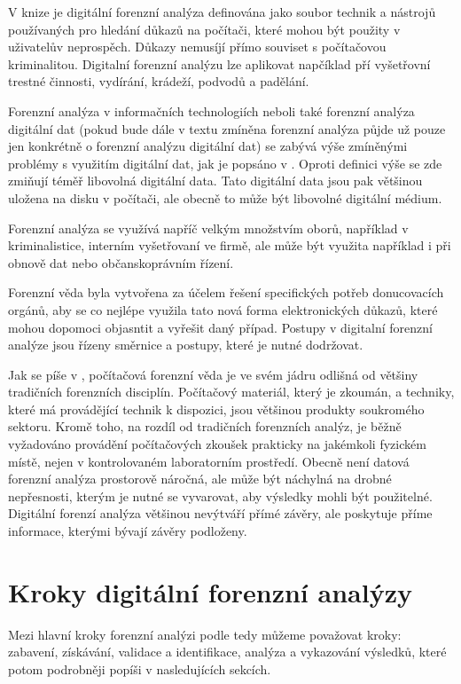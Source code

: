 \documentclass[thesis=B,czech]{FITthesis}[2012/06/26]
\begin{document}
V knize \cite{RECHAndBook} je digitální forenzní analýza definována jako soubor technik a nástrojů používaných pro hledání důkazů na počítači, které mohou být použity v uživatelův neprospěch. Důkazy nemusíjí přímo souviset s počítačovou kriminalitou. Digitalní forenzní analýzu lze aplikovat napčíklad pří vyšetřovní trestné činnosti, vydírání, krádeží, podvodů a padělání.

Forenzní analýza v informačních technologiích neboli také forenzní analýza digitální dat (pokud bude dále v textu zmíněna forenzní analýza půjde už pouze jen konkrétně o forenzní analýzu digitální dat) se zabývá výše zmíněnými problémy s využitím digitální dat, jak je popsáno v \cite{for_root}. Oproti definici výše se zde zmiňují téměř libovolná digitální data. Tato digitální data jsou pak většinou uložena na disku v počítači, ale obecně to může být libovolné digitální médium.

Forenzní analýza se využívá napříč velkým množstvím oborů, například v kriminalistice, interním vyšetřovaní ve firmě, ale může být využita například i při obnově dat nebo občanskoprávním řízení.

Forenzní věda byla vytvořena za účelem řešení specifických potřeb donucovacích orgánů, aby se co nejlépe využila tato nová forma elektronických důkazů, které mohou dopomoci objasntit a vyřešit daný případ. Postupy v digitalní forenzní analýze jsou řízeny směrnice a postupy, které je nutné dodržovat.

Jak se píše v \cite{for_uvod}, počítačová forenzní věda je ve svém jádru odlišná od většiny tradičních forenzních disciplín. Počítačový materiál, který je zkoumán, a techniky, které má provádějící technik k dispozici, jsou většinou produkty soukromého sektoru. Kromě toho, na rozdíl od tradičních forenzních analýz, je běžně vyžadováno provádění počítačových zkoušek prakticky na jakémkoli fyzickém místě, nejen v kontrolovaném laboratorním prostředí. Obecně není datová forenzní analýza prostorově náročná, ale může být náchylná na drobné nepřesnosti, kterým je nutné se vyvarovat, aby výsledky mohli být použitelné. Digitální forenzí analýza většinou nevýtváří přímé závěry, ale poskytuje příme informace, kterými bývají závěry podloženy.


\section{Kroky digitální forenzní analýzy}
Mezi hlavní kroky forenzní analýzi podle \cite{carroll2008computer} tedy můžeme považovat kroky: zabavení, získávání, validace a identifikace, analýza a vykazování výsledků, které potom podrobněji popíši v nasledujících sekcích.
\end{document}
